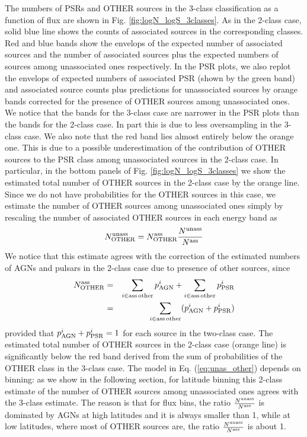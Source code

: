 \documentclass{aa}
\newcommand{\bea}{\begin{eqnarray}}
\newcommand{\eea}{\end{eqnarray}}
\newcommand{\lb}{\label}
\begin{document}
The numbers of PSRs and OTHER sources in the 3-class classification as a function of flux are shown in Fig. \ref{fig:logN_logS_3classes}.
As in the 2-class case, solid blue line shows the counts of associated sources in the corresponding classes.
Red and blue bands show the envelops of the expected number of associated sources and the number of associated sources plus the expected numbers of sources among unassociated ones respectively.
In the PSR plots, we also replot the envelops of expected numbers of associated PSR (shown by the green band) and associated source counts plus predictions for unassociated sources by orange bands corrected for the presence of OTHER sources among unassociated ones.
We notice that the bands for the 3-class case are narrower in the PSR plots than the bands for the 2-class case.
In part this is due to less oversampling in the 3-class case. 
We also note that the red band lies almost entirely below the orange one.
This is due to a possible underestimation of the contribution of OTHER sources to the PSR class among unassociated sources
in the 2-class case.
In particular, in the bottom panels of Fig. \ref{fig:logN_logS_3classes} we show the estimated total number of OTHER sources in the 2-class case by the orange line.
Since we do not have probabilities for the OTHER sources in this case, we estimate the number of OTHER sources among unassociated ones 
simply by rescaling the number of associated OTHER sources in each energy band as
\bea
\lb{eq:unas_other}
N_{\rm OTHER}^{\rm unass} = N_{\rm OTHER}^{\rm ass} \frac{N^{\rm unass}}{N^{\rm ass}}
\eea
We notice that this estimate agrees with the correction of the estimated numbers of AGNs and pulsars in the 2-class case due to presence of other sources, since
\bea
\nonumber
N_{\rm OTHER}^{\rm ass} &=& \sum_{i \in \rm ass\,other} p^i_{\rm AGN} + \sum_{i \in \rm ass\,other} p^i_{\rm PSR} \\
&=& \sum_{i \in \rm ass\,other} (p^i_{\rm AGN} + p^i_{\rm PSR})
\eea
provided that $p^i_{\rm AGN} + p^i_{\rm PSR} = 1$ for each source in the two-class case.
The estimated total number of OTHER sources in the 2-class case (orange line) is significantly below the red band derived from the sum of probabilities of the OTHER class in the 3-class case.
The model in Eq. (\ref{eq:unas_other}) depends on binning: as we show in the following section, for latitude binning this 2-class
estimate of the number of OTHER sources among unassociated ones agrees with the 3-class estimate.
The reason is that for flux bins, the ratio $\frac{N^{\rm unass}}{N^{\rm ass}}$ is dominated by AGNs at high latitudes and it is always smaller than 1, while at low latitudes, where most of OTHER sources are, the ratio $\frac{N^{\rm unass}}{N^{\rm ass}}$ is about 1.
\end{document}
